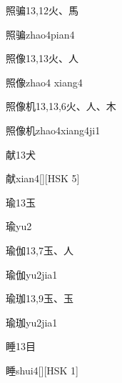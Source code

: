 \begin{entry}{照骗}{13,12}{⽕、⾺}
  \begin{phonetics}{照骗}{zhao4pian4}
  \end{phonetics}
\end{entry}

\begin{entry}{照像}{13,13}{⽕、⼈}
  \begin{phonetics}{照像}{zhao4 xiang4}
  \end{phonetics}
\end{entry}

\begin{entry}{照像机}{13,13,6}{⽕、⼈、⽊}
  \begin{phonetics}{照像机}{zhao4xiang4ji1}
  \end{phonetics}
\end{entry}

\begin{entry}{献}{13}{⽝}
  \begin{phonetics}{献}{xian4}[][HSK 5]
  \end{phonetics}
\end{entry}

\begin{entry}{瑜}{13}{⽟}
  \begin{phonetics}{瑜}{yu2}
  \end{phonetics}
\end{entry}

\begin{entry}{瑜伽}{13,7}{⽟、⼈}
  \begin{phonetics}{瑜伽}{yu2jia1}
  \end{phonetics}
\end{entry}

\begin{entry}{瑜珈}{13,9}{⽟、⽟}
  \begin{phonetics}{瑜珈}{yu2jia1}
  \end{phonetics}
\end{entry}

\begin{entry}{睡}{13}{⽬}
  \begin{phonetics}{睡}{shui4}[][HSK 1]
  \end{phonetics}
\end{entry}

